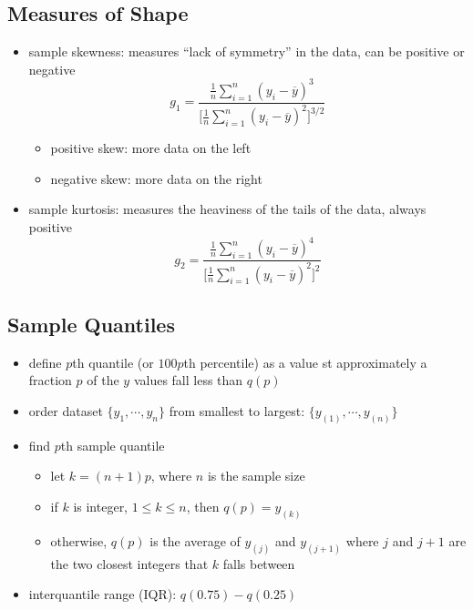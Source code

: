 \documentclass[11pt]{article}
\newcommand{\ds}{\displaystyle}
\begin{document}
\subsection{Measures of Shape}
\begin{itemize}
  \item sample skewness: measures ``lack of symmetry'' in the data, can be positive or negative \[g_1 = \ds\frac{\frac{1}{n}\ds\sum_{i=1}^{n}(y_i-\overline{y})^3}{\Big[\frac{1}{n}\ds\sum_{i=1}^{n}(y_i-\overline{y})^2\Big]^{3/2}}\]
  \begin{itemize}
    \item positive skew: more data on the left
    \item negative skew: more data on the right 
  \end{itemize}
  \item sample kurtosis: measures the heaviness of the tails of the data, always positive \[g_2 = \ds\frac{\frac{1}{n}\ds\sum_{i=1}^{n}(y_i-\overline{y})^4}{\Big[\frac{1}{n}\ds\sum_{i=1}^{n}(y_i-\overline{y})^2\Big]^{2}}\]
\end{itemize}
\subsection{Sample Quantiles}
\begin{itemize}
  \item define $p$th quantile (or $100p$th percentile) as a value st approximately a fraction $p$ of the $y$ values fall less than $q(p)$
  \item order dataset $\{y_1,\cdots,y_n\}$ from smallest to largest: $\{y_{(1)},\cdots,y_{(n)}\}$
  \item find $p$th sample quantile
  \begin{itemize}
    \item let $k=(n+1)p$, where $n$ is the sample size 
    \item if $k$ is integer, $1\leq k\leq n$, then $q(p)=y_{(k)}$
    \item otherwise, $q(p)$ is the average of $y_{(j)}$ and $y_{(j+1)}$ where $j$ and $j+1$ are the two closest integers that $k$ falls between 
  \end{itemize}
  \item interquantile range (IQR): $q(0.75)-q(0.25)$
\end{itemize}
\end{document}
